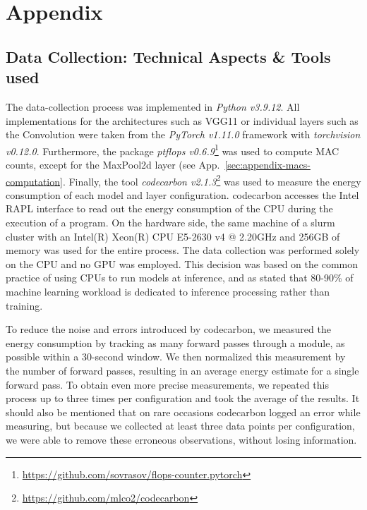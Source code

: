 \section{Appendix}
\subsection{Data Collection: Technical Aspects \& Tools used}
\label{sec:appendix-data-collection}
The data-collection process was implemented in \emph{Python v3.9.12}. All implementations for the architectures such as VGG11 or individual layers such as the Convolution were taken from the \emph{PyTorch v1.11.0} framework with \emph{torchvision v0.12.0}. Furthermore, the package \emph{ptflops v0.6.9}\footnote{\url{https://github.com/sovrasov/flops-counter.pytorch}} was used to compute MAC counts, except for the MaxPool2d layer (see App.~\ref{sec:appendix-macs-computation}. Finally, the tool \emph{codecarbon v2.1.3}\footnote{\url{https://github.com/mlco2/codecarbon}}  was used to measure the energy consumption of each model and layer configuration. codecarbon accesses the Intel RAPL interface to read out the energy consumption of the CPU during the execution of a program. On the hardware side, the same machine of a slurm cluster with an Intel(R) Xeon(R) CPU E5-2630 v4 @ 2.20GHz and 256GB of memory was used for the entire process. The data collection was performed solely on the CPU and no GPU was employed. This decision was based on the common practice of using CPUs to run models at inference, and as \citet{misnomer} stated that 80-90\% of machine learning workload is dedicated to inference processing rather than training.

To reduce the noise and errors introduced by codecarbon, we measured the energy consumption by tracking as many forward passes through a module, as possible within a 30-second window. We then normalized this measurement by the number of forward passes, resulting in an average energy estimate for a single forward pass. To obtain even more precise measurements, we repeated this process up to three times per configuration and took the average of the results. It should also be mentioned that on rare occasions codecarbon logged an error while measuring, but because we collected at least three data points per configuration, we were able to remove these erroneous observations, without losing information.
%
